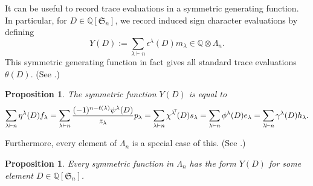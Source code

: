 \documentclass[12pt]{amsart}
\newtheorem{prop}[thm]{Proposition}
\numberwithin{equation}{section}
\newcommand{\sn}{\mathfrak{S}_n}
\newcommand{\qsn}{\mathbb{Q}[\sn]}
\newcommand{\hnq}{H_n(q)}
\newcommand{\defeq}{:=}
\newcommand{\tr}{{\negthickspace \top \negthickspace}}
\newcommand{\ntnsp}{\negthinspace}
\newcommand{\nTksp}{\negthickspace\negthickspace}
\newcommand{\trspace}[1]{\mathcal{T}_{#1}}
\begin{document}

It can be useful to record trace evaluations
in a symmetric generating function.
In particular, for $D \in \qsn$,
we record induced sign character evaluations by defining
\begin{equation}\label{eq:ydef}
  Y(D) \defeq \sum_{\lambda \vdash n} \epsilon^\lambda(D) m_\lambda
  \in \mathbb Q \otimes \Lambda_n.
\end{equation}
This symmetric generating function in fact gives all
standard trace evaluations $\theta(D)$.
(See \cite[Prop.\,2.1]{SkanCCS}.)
\begin{prop}\label{p:Yexpand}
The symmetric function $Y(D)$ is equal to
  \begin{equation*}
      \sum_{\lambda \vdash n} \eta^\lambda(D)f_\lambda
    = \sum_{\lambda \vdash n}\frac{(-1)^{n-\ell(\lambda)}\psi^\lambda(D)}{z_\lambda}p_\lambda
    = \sum_{\lambda \vdash n} \chi^{\lambda^\tr}(D)s_\lambda
    = \sum_{\lambda \vdash n} \phi^\lambda(D)e_\lambda
    = \sum_{\lambda \vdash n} \gamma^\lambda(D)h_\lambda.
  \end{equation*}
\end{prop}
\noindent
Furthermore, every element of $\Lambda_n$ is a special case of this.
(See \cite[Prop.\,2.3]{SkanCCS}.)
\begin{prop}\label{p:everysymmfn}
   Every symmetric function in $\Lambda_n$
  has the form $Y(D)$ for some element $D \in \qsn$.
\end{prop}
    
\end{document}
